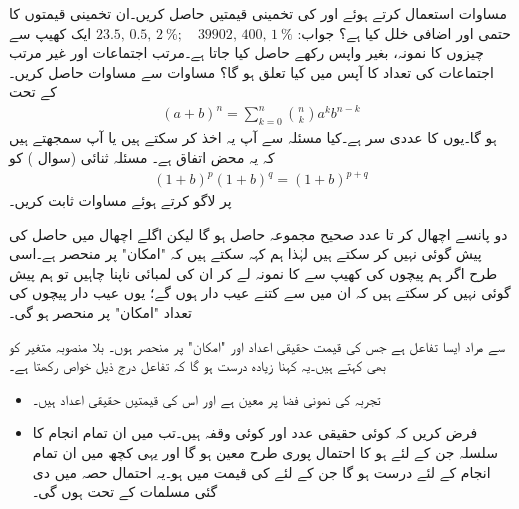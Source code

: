 \quad
مساوات  استعمال کرتے ہوئے  اور  کی تخمینی قیمتیں حاصل کریں۔ان تخمینی قیمتوں کا حتمی اور اضافی خلل کیا ہے؟
جواب:\quad
$23.5,\,0.5,\,\SI{2}{\percent};\quad \num{39902},\,400,\,\SI{1}{\percent}$
\quad
ایک کھیپ سے  چیزوں کا نمونہ، بغیر واپس رکھے حاصل کیا جاتا ہے۔مرتب اجتماعات اور غیر مرتب اجتماعات کی تعداد کا آپس میں کیا تعلق ہو گا؟
\quad
مساوات  سے مساوات  حاصل کریں۔
\quad {} \quad
{} کے تحت
\begin{align*}
(a+b)^n=\sum_{k=0}^{n}\binom{n}{k}a^kb^{n-k}
\end{align*}
ہو گا۔یوں  کا عددی سر  ہے۔کیا مسئلہ  سے آپ یہ اخذ کر سکتے ہیں یا آپ سمجھتے ہیں کہ یہ محض اتفاق ہے۔
\quad
مسئلہ ثنائی (سوال ) کو
\begin{align*}
(1+b)^p(1+b)^q=(1+b)^{p+q}
\end{align*}
پر لاگو کرتے ہوئے مساوات  ثابت کریں۔

دو پانسے اچھال کر  تا  عدد صحیح مجموعہ   حاصل ہو گا لیکن اگلے اچھال  میں حاصل   کی پیش گوئی نہیں کر سکتے ہیں لہٰذا ہم کہہ سکتے ہیں کہ  "امکان" پر منحصر ہے۔اسی طرح اگر ہم پیچوں کی کھیپ سے  کا نمونہ لے کر ان کی لمبائی ناپنا چاہیں تو ہم پیش گوئی نہیں کر سکتے ہیں کہ ان میں سے کتنے عیب دار ہوں گے؛ یوں عیب دار پیچوں کی تعداد  "امکان" پر منحصر ہو گی۔

   سے مراد ایسا تفاعل ہے جس کی قیمت حقیقی اعداد اور  "امکان" پر منحصر ہوں۔ بلا منصوبہ متغیر کو  بھی کہتے ہیں۔یہ کہنا زیادہ درست ہو گا کہ تفاعل  درج ذیل خواص رکھتا ہے۔
\begin{itemize}
\item
تجربہ کی نمونی فضا  پر  معین ہے اور اس کی قیمتیں حقیقی اعداد ہیں۔
\item
فرض کریں کہ  کوئی حقیقی عدد اور  کوئی وقفہ ہیں۔تب  میں ان تمام انجام کا سلسلہ جن کے لئے  ہو کا احتمال پوری طرح معین ہو گا اور یہی کچھ  میں ان تمام انجام کے لئے درست ہو گا جن کے لئے  کی قیمت  میں ہو۔یہ احتمال حصہ  میں دی گئی مسلمات کے تحت ہوں گی۔
\end{itemize}


